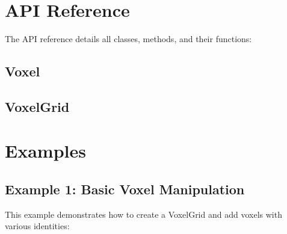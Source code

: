 \documentclass[letterpaper,10pt,english]{sphinxmanual}
\begin{document}
\sphinxstepscope


\chapter{API Reference}
\label{\detokenize{api_reference:api-reference}}\label{\detokenize{api_reference::doc}}
\sphinxAtStartPar
The API reference details all classes, methods, and their functions:

\section{Voxel}
\label{\detokenize{api_reference:module-VoxelForge.Voxel}}\label{\detokenize{api_reference:voxel}}\label{\detokenize{api_reference:module-VoxelForge}}

\section{VoxelGrid}
\label{\detokenize{api_reference:module-VoxelForge.VoxelGrid}}\label{\detokenize{api_reference:voxelgrid}}
\sphinxstepscope


\chapter{Examples}
\label{\detokenize{examples:examples}}\label{\detokenize{examples::doc}}

\section{Example 1: Basic Voxel Manipulation}
\label{\detokenize{examples:example-1-basic-voxel-manipulation}}
\sphinxAtStartPar
This example demonstrates how to create a VoxelGrid and add voxels with various identities:
\end{document}
